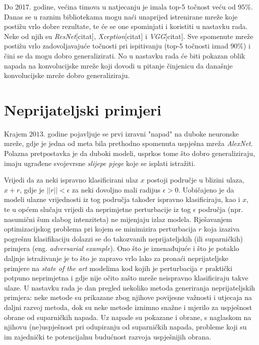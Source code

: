 \documentclass[utf8, diplomski]{fer}
\begin{document}
Do 2017. godine, većina timova u natjecanju je imala top-5 točnost veću od $95\%$. Danas se u raznim bibliotekama mogu naći unaprijed istrenirane mreže koje postižu vrlo dobre rezultate, te će se one spominjati i koristiti u nastavku rada. Neke od njih su \textit{ResNet}[citat], \textit{Xception}[citat] i \textit{VGG}[citat]. Sve spomenute mreže postižu vrlo zadovoljavajuće točnosti pri ispitivanju (top-5 točnosti iznad $90\%$) i čini se da mogu dobro generalizirati. No u nastavku rada će biti pokazan oblik napada na konvolucijske mreže koji dovodi u pitanje činjenicu da današnje konvolucijske mreže dobro generaliziraju.
\section{Neprijateljski primjeri}
Krajem $2013.$ godine pojavljuje se prvi izravni "napad" na duboke neuronske mreže\citep{Szegedy2014IntriguingPO}, gdje je jedna od meta bila prethodno spomenuta uspješna mreža \textit{AlexNet}. Polazna pretpostavka je da duboki modeli, usprkos tome što dobro generaliziraju, imaju ugrađene svojevrsne \textit{slijepe pjege} koje se isplati istražiti.
\par
Vrijedi da za neki ispravno klasificirani ulaz $x$ postoji područje u blizini ulaza, $x + r$, gdje je $||r|| < \epsilon$ za neki dovoljno mali radijus $\epsilon > 0$. Uobičajeno je da modeli ulazne vrijednosti iz tog područja također ispravno klasificiraju, kao i $x$, te u općem slučaju vrijedi da neprimjetne perturbacije iz tog $\epsilon$ područja (npr. nasumični šum slabog intenziteta) ne mijenjaju izlaz modela. Rješavanjem optimizacijskog problema pri kojem se minimizira perturbacija $r$ koja izaziva pogrešnu klasifikaciju dolazzi se do takozvanih neprijateljskih (ili suparničkih) primjera (eng. \textit{adversarial example}). Ono što je iznenađujuće i što je potaklo daljnje istraživanje je to što je zapravo vrlo lako za pronaći neprijateljske primjere na \textit{state of the art} modelima kod kojih je perturbacija $r$ praktički potpuno neprimjetna i gdje nije očito zašto mreže neispravno klasificiraju takve ulaze. U nastavku rada je dan pregled nekoliko metoda generiranja neprijateljskih primjera: neke metode su prikazane zbog njihove povijesne važnosti i utjecaja na daljni razvoj metoda, dok su neke metode iznimno snažne i mjerilo za uspješnost obrane od suparničkih napada. Uz napade su pokazane i obrane, s naglaskom na njihovu (ne)uspješnost pri odupiranju od suparničkih napada, probleme koji su im zajednički te potencijalnu budućnost razvoja uspješnijih obrana.
\end{document}
